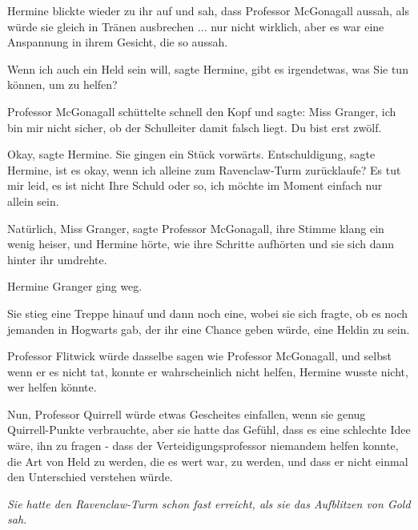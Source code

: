 Hermine blickte wieder zu ihr auf und sah, dass Professor McGonagall aussah, als
würde sie gleich in Tränen ausbrechen ... nur nicht wirklich, aber es war eine
Anspannung in ihrem Gesicht, die so aussah.

\glqq{}Wenn ich auch ein Held sein will\grqq{}, sagte Hermine, \glqq{}gibt es
irgendetwas, was Sie tun können, um zu helfen?\grqq{}

Professor McGonagall schüttelte schnell den Kopf und sagte: \glqq{}Miss Granger,
ich bin mir nicht sicher, ob der Schulleiter damit falsch liegt. Du bist erst
zwölf.\grqq{}

\glqq{}Okay\grqq{}, sagte Hermine. Sie gingen ein Stück vorwärts. \glqq{}
Entschuldigung\grqq{}, sagte Hermine, \glqq{}ist es okay, wenn ich alleine zum
Ravenclaw-Turm zurücklaufe? Es tut mir leid, es ist nicht Ihre Schuld oder so,
ich möchte im Moment einfach nur allein sein.\grqq{}

\glqq{}Natürlich, Miss Granger\grqq{}, sagte Professor McGonagall, ihre Stimme
klang ein wenig heiser, und Hermine hörte, wie ihre Schritte aufhörten und sie
sich dann hinter ihr umdrehte.

Hermine Granger ging weg.

Sie stieg eine Treppe hinauf und dann noch eine, wobei sie sich fragte, ob es
noch jemanden in Hogwarts gab, der ihr eine Chance geben würde, eine Heldin zu
sein.

Professor Flitwick würde dasselbe sagen wie Professor McGonagall, und selbst
wenn er es nicht tat, konnte er wahrscheinlich nicht helfen, Hermine wusste
nicht, wer helfen könnte.

Nun, Professor Quirrell würde etwas Gescheites einfallen, wenn sie genug
Quirrell-Punkte verbrauchte, aber sie hatte das Gefühl, dass es eine schlechte
Idee wäre, ihn zu fragen - dass der Verteidigungsprofessor niemandem helfen
konnte, die Art von Held zu werden, die es wert war, zu werden, und dass er
nicht einmal den Unterschied verstehen würde.

\emph{Sie hatte den Ravenclaw-Turm
schon fast erreicht, als sie das Aufblitzen von Gold sah.}

